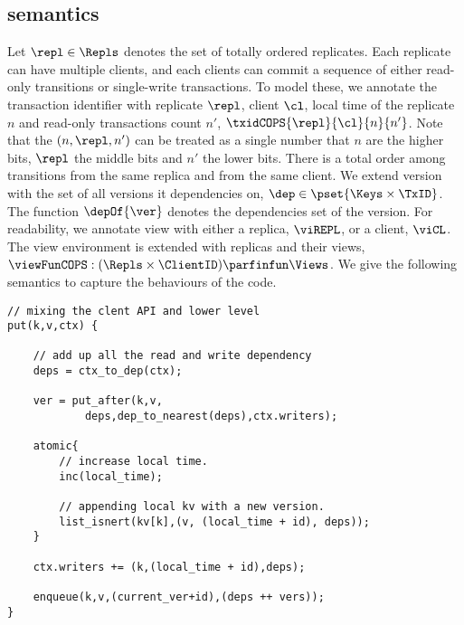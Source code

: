 \subsection{semantics}
Let \( \repl \in \Repls \) denotes the set of totally ordered replicates.
Each replicate can have multiple clients, and 
each clients can commit a sequence of either read-only transitions or single-write transactions.
To model these, we annotate the transaction identifier with replicate \( \repl \), client \( \cl \), 
local time of the replicate \( n \) and read-only transactions count \( n' \), \ie \( \txidCOPS{\repl}{\cl}{n}{n'} \).
Note that the \( (n, \repl, n') \) can be treated as a single number that \( n \) are the higher bits, 
\( \repl \) the middle bits and \( n' \) the lower bits.
There is a total order among transitions from the same replica and from the same client.
We extend version with the set of all versions it dependencies on, \( \dep \in \pset{\Keys \times \TxID} \).
The function \( \depOf{\ver} \) denotes the dependencies set of the version.
For readability, we annotate view with either a replica, \( \viREPL \), or a client, \( \viCL \).
The view environment is extended with replicas and their views, \( \viewFunCOPS : (\Repls \times \ClientID ) \parfinfun \Views \).
We give the following semantics to capture the behaviours of the code.

\begin{lstlisting}
// mixing the clent API and lower level
put(k,v,ctx) {

    // add up all the read and write dependency
    deps = ctx_to_dep(ctx);

    ver = put_after(k,v,
            deps,dep_to_nearest(deps),ctx.writers);

    atomic{
        // increase local time.
        inc(local_time);

        // appending local kv with a new version.
        list_isnert(kv[k],(v, (local_time + id), deps));
    }

    ctx.writers += (k,(local_time + id),deps);

    enqueue(k,v,(current_ver+id),(deps ++ vers));
}
\end{lstlisting}

